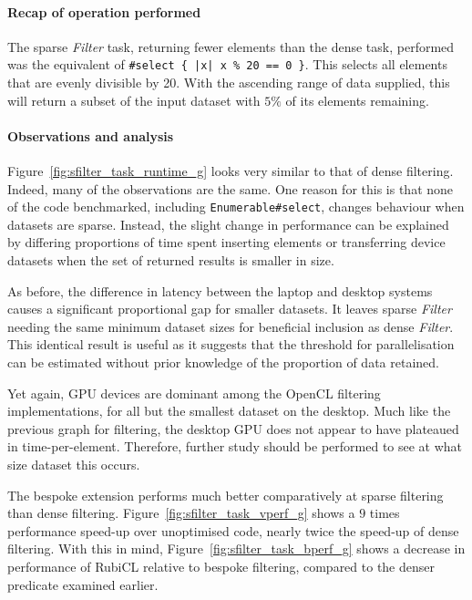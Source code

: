 \paragraph*{Recap of operation performed}
The sparse \emph{Filter} task, returning fewer elements than the dense task, performed was the equivalent of \verb!#select { |x| x % 20 == 0 }!. This selects all elements that are evenly divisible by 20. With the ascending range of data supplied, this will return a subset of the input dataset with $5\%$ of its elements remaining.

\paragraph*{Observations and analysis}
Figure~\ref{fig:sfilter_task_runtime_g} looks very similar to that of dense filtering. Indeed, many of the observations are the same.
One reason for this is that none of the code benchmarked, including \verb|Enumerable#select|, changes behaviour when datasets are sparse.
Instead, the slight change in performance can be explained by differing proportions of time spent inserting elements or transferring device datasets when the set of returned results is smaller in size.

As before, the difference in latency between the laptop and desktop systems causes a significant proportional gap for smaller datasets.
It leaves sparse \emph{Filter} needing the same minimum dataset sizes for beneficial inclusion as dense \emph{Filter}.
This identical result is useful as it suggests that the threshold for parallelisation can be estimated without prior knowledge of the proportion of data retained.

Yet again, \ac{GPU} devices are dominant among the \ac{OpenCL} filtering implementations, for all but the smallest dataset on the desktop.
Much like the previous graph for filtering, the desktop \ac{GPU} does not appear to have plateaued in time-per-element. Therefore, further study should be performed to see at what size dataset this occurs.

The bespoke extension performs much better comparatively at sparse filtering than dense filtering. Figure~\ref{fig:sfilter_task_vperf_g} shows a $9$ times performance speed-up over unoptimised code, nearly twice the speed-up of dense filtering.
With this in mind, Figure~\ref{fig:sfilter_task_bperf_g} shows a decrease in performance of RubiCL relative to bespoke filtering, compared to the denser predicate examined earlier.

